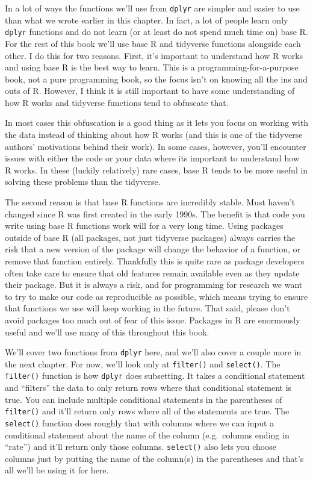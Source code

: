 \documentclass[
]{krantz}
\begin{document}
In a lot of ways the functions we'll use from \texttt{dplyr} are simpler and easier to use than what we wrote earlier in this chapter. In fact, a lot of people learn only \texttt{dplyr} functions and do not learn (or at least do not spend much time on) base R. For the rest of this book we'll use base R and tidyverse functions alongside each other. I do this for two reasons. First, it's important to understand how R works and using base R is the best way to learn. This is a programming-for-a-purpose book, not a pure programming book, so the focus isn't on knowing all the ins and outs of R. However, I think it is still important to have some understanding of how R works and tidyverse functions tend to obfuscate that.

In most cases this obfuscation is a good thing as it lets you focus on working with the data instead of thinking about how R works (and this is one of the tidyverse authors' motivations behind their work). In some cases, however, you'll encounter issues with either the code or your data where its important to understand how R works. In these (luckily relatively) rare cases, base R tends to be more useful in solving these problems than the tidyverse.

The second reason is that base R functions are incredibly stable. Must haven't changed since R was first created in the early 1990s. The benefit is that code you write using base R functions work will for a very long time. Using packages outside of base R (all packages, not just tidyverse packages) always carries the risk that a new version of the package will change the behavior of a function, or remove that function entirely. Thankfully this is quite rare as package developers often take care to ensure that old features remain available even as they update their package. But it is always a risk, and for programming for research we want to try to make our code as reproducible as possible, which means trying to ensure that functions we use will keep working in the future. That said, please don't avoid packages too much out of fear of this issue. Packages in R are enormously useful and we'll use many of this throughout this book.

We'll cover two functions from \texttt{dplyr} here, and we'll also cover a couple more in the next chapter. For now, we'll look only at \texttt{filter()} and \texttt{select()}. The \texttt{filter()} function is how \texttt{dplyr} does subsetting. It takes a conditional statement and ``filters'' the data to only return rows where that conditional statement is true. You can include multiple conditional statements in the parentheses of \texttt{filter()} and it'll return only rows where all of the statements are true. The \texttt{select()} function does roughly that with columns where we can input a conditional statement about the name of the column (e.g.~columns ending in ``rate'') and it'll return only those columns. \texttt{select()} also lets you choose columns just by putting the name of the column(s) in the parentheses and that's all we'll be using it for here.
\end{document}
